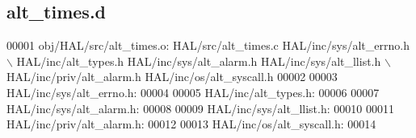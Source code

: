 \subsection{alt\+\_\+times.\+d}
\label{alt__times_8d_source}

\begin{DoxyCode}
00001 obj/HAL/src/alt\_times.o: HAL/src/alt\_times.c HAL/inc/sys/alt_errno.h \(\backslash\)
 HAL/inc/alt\_types.h HAL/inc/sys/alt_alarm.h HAL/inc/sys/alt_llist.h \(\backslash\)
 HAL/inc/priv/alt_alarm.h HAL/inc/os/alt\_syscall.h
00002 
00003 HAL/inc/sys/alt_errno.h:
00004 
00005 HAL/inc/alt\_types.h:
00006 
00007 HAL/inc/sys/alt_alarm.h:
00008 
00009 HAL/inc/sys/alt_llist.h:
00010 
00011 HAL/inc/priv/alt_alarm.h:
00012 
00013 HAL/inc/os/alt\_syscall.h:
00014 \end{DoxyCode}
